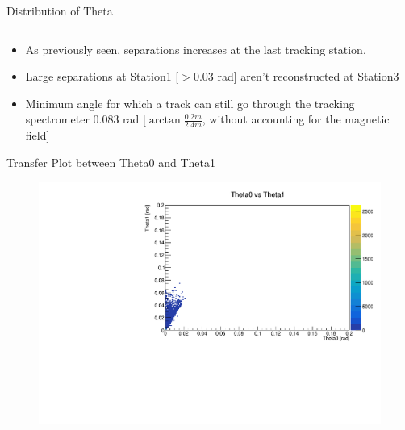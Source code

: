 \begin{frame}{Distribution of Theta}
\begin{columns}
	\end{columns}
	\vspace{0.5cm}
	\begin{itemize}
		\scriptsize
		\item As previously seen, separations increases at the last tracking station.
		\item Large separations at Station1 [$>$0.03 rad] aren't reconstructed at Station3
		\item Minimum angle for which a track can still go through the tracking spectrometer 0.083 rad [$\arctan{\frac{0.2 m}{2.4 m}}$, without accounting for the magnetic field]
	\end{itemize}
\end{frame}

\begin{frame}{Transfer Plot between Theta0 and Theta1}
	\begin{figure}
		\includegraphics[width=\linewidth]{output/Theta0 vs Theta1.pdf}
	\end{figure}
\end{frame}




